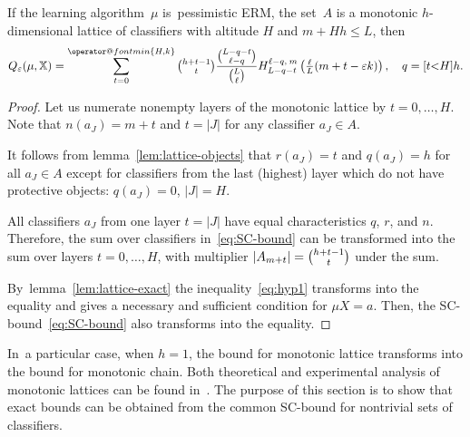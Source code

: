 \documentclass{article}
\makeatletter
\let\cite\citep
\def\XX{\mathbb{X}}
\renewcommand{\leq}{\leqslant}
\renewcommand{\min}{\mathop{\operator@font min}\limits}
\def\CC_#1^#2{\tbinom{#1}{#2}}
\newcommand{\hypergeom}[5]{{#1}_{#2}^{#4,\:#3}\left(#5\right)}
\newcommand{\Hyper}[4]{\hypergeom{H}{#1}{#2}{#3}{#4}}
\newcommand{\TODO}[1]{\par\smallskip\noindent\fbox{\parbox{150mm}{\textsf{\textbf{~~TO DO:} #1}}}\par\smallskip}
\makeatother
\begin{document}
\begin{theorem}
\label{th:lattice}
    If the learning algorithm~$\mu$ is~pessimistic ERM,
    the set~$A$ is a monotonic $h$-dimensional lattice of classifiers with altitude $H$
    and $m+Hh \leq L$, then
    \[
        Q_\eps(\mu,\XX)
        =
        \sum_{t=0}^{\min\{H,k\}}
            \CC_{h+t-1}^t \frac{\CC_{L-q-t}^{\ell-q}}{\CC_{L}^{\ell}}
            \Hyper{L-q-t}{m}{\ell-q}{\tfrac\ell L (m+t - \eps k)},
        \quad
        q=[t{<}H] h.
    \]
\end{theorem}
\begin{proof}
    Let us numerate nonempty layers of the monotonic lattice by $t=0,\ldots,H$.
    Note that $n(a_J) = m+t$ and $t=|J|$ for any classifier $a_J\in A$.

    It follows from lemma~\ref{lem:lattice-objects} that
    $r(a_J)=t$ and $q(a_J)=h$ for all $a_J \in A$
    except for classifiers from the last (highest) layer
    which do not have protective objects:
    $q(a_J) = 0$, $|J|=H$.

    All classifiers $a_J$ from one layer $t=|J|$
    have equal characteristics $q$, $r$, and $n$.
    Therefore, the sum over classifiers in~\eqref{eq:SC-bound}
    can be transformed into the sum over layers $t=0,\ldots,H$,
    with multiplier $|A_{m+t}| = \CC_{h+t-1}^t$ under the sum.

    By~lemma~\ref{lem:lattice-exact}
    the inequality~\eqref{eq:hyp1} transforms into the equality
    and gives a necessary and sufficient condition for $\mu X=a$.
    Then, the SC-bound~\eqref{eq:SC-bound} also transforms into the equality.
\end{proof}

In~a particular case, when $h=1$, the bound for monotonic lattice transforms into the bound for monotonic chain.
Both theoretical and experimental analysis of monotonic lattices can be found in~\cite{botov11pria}.
The purpose of this section is to show that
exact bounds can be obtained from the common SC-bound for nontrivial sets of classifiers.

%
\end{document}
